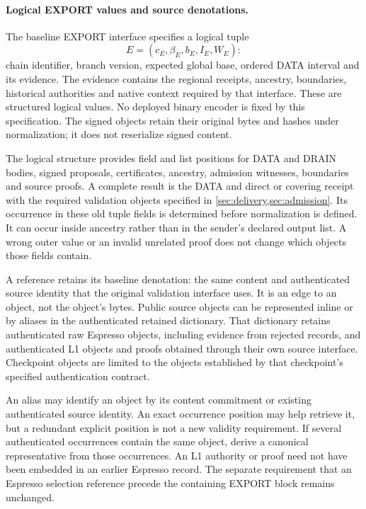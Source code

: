 \paragraph{Logical EXPORT values and source denotations.}
\label{sec:logical-carrier}
The baseline EXPORT interface specifies a logical tuple
\[
 E=(c_E,\beta_E,b_E,I_E,W_E):
\]
chain identifier, branch version, expected global base, ordered DATA
interval and its evidence. The evidence contains the regional
receipts, ancestry, boundaries, historical authorities and native
context required by that interface. These are structured logical
values. No deployed binary encoder is fixed by this specification.
The signed objects retain their original bytes and hashes under
normalization; it does not reserialize signed content.

The logical structure provides field and list positions for DATA and
DRAIN bodies, signed proposals, certificates, ancestry, admission
witnesses, boundaries and source proofs. A complete result is the
DATA and direct or covering receipt with the required validation
objects specified in \cref{sec:delivery,sec:admission}. Its occurrence
in these old tuple fields is determined before normalization is
defined. It can occur inside ancestry rather than in the sender's
declared output list. A wrong outer value or an invalid unrelated
proof does not change which objects those fields contain.

A reference retains its baseline denotation: the same content and
authenticated source identity that the original validation interface
uses. It is an edge to an object, not the object's bytes. Public source
objects can be represented inline or by aliases in the authenticated
retained dictionary. That dictionary retains authenticated raw
Espresso objects, including evidence from rejected records, and
authenticated L1 objects and proofs obtained through their own source
interface. Checkpoint objects are limited to the objects established
by that checkpoint's specified authentication contract.

An alias may identify an object by its content commitment or existing
authenticated source identity. An exact occurrence position may help
retrieve it, but a redundant explicit position is not a new validity
requirement. If several authenticated occurrences contain the same
object, derive a canonical representative from those occurrences.
An L1 authority or proof need not have been embedded in an earlier
Espresso record. The separate requirement that an Espresso selection
reference precede the containing EXPORT block remains unchanged.


